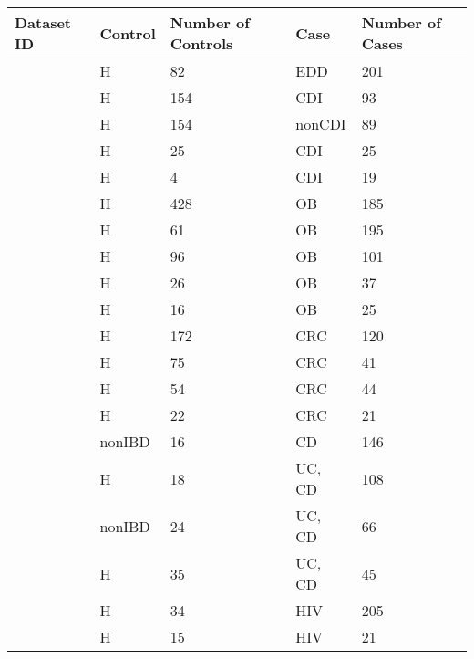 \begin{table}[hbtp!]
	\centering
	\begin{tabular}{l l p{} l p{}}
	\toprule
	   Dataset ID & Control & Number of Controls & Case &Number of Cases\\
	   \midrule
		\cite{edd-singh} & \acrshort{H} & 82 & \acrshort{EDD} & 201 \\
		\cite{cdi-schubert} & \acrshort{H} & 154 & \acrshort{CDI} & 93 \\
		\cite{cdi-schubert} & \acrshort{H} & 154 & \acrshort{nonCDI} & 89 \\
		\cite{cdi-vincent} & \acrshort{H} & 25 & \acrshort{CDI} & 25 \\
		\cite{cdi-youngster} & \acrshort{H} & 4 & \acrshort{CDI} & 19 \\
		\cite{ob-goodrich} & \acrshort{H} & 428 & \acrshort{OB} & 185 \\
		\cite{ob-turnbaugh} & \acrshort{H} & 61 & \acrshort{OB} & 195 \\
		\cite{ob-zupancic} & \acrshort{H} & 96 & \acrshort{OB} & 101 \\
		\cite{ob-ross} & \acrshort{H} & 26 & \acrshort{OB} & 37 \\
		\cite{nash-zhu} & \acrshort{H} & 16 & \acrshort{OB} & 25 \\
		\cite{crc-baxter} & \acrshort{H} & 172 & \acrshort{CRC} & 120 \\
		\cite{crc-zeller} & \acrshort{H} & 75 & \acrshort{CRC} & 41 \\
		\cite{crc-zhaowang} & \acrshort{H} & 54 & \acrshort{CRC} & 44 \\
		\cite{crc-chen} & \acrshort{H} & 22 & \acrshort{CRC} & 21 \\
		\cite{ibd-gevers} & \acrshort{nonIBD} & 16 & \acrshort{CD} & 146 \\
		\cite{ibd-morgan} & \acrshort{H} & 18 & \acrshort{UC}, \acrshort{CD} & 108 \\
		\cite{ibd-papa} & \acrshort{nonIBD} & 24 & \acrshort{UC}, \acrshort{CD} & 66 \\
		\cite{ibd-willing} & \acrshort{H} & 35 & \acrshort{UC}, \acrshort{CD} & 45 \\
		\cite{noguera2016gut} & \acrshort{H} & 34 & \acrshort{HIV} & 205 \\
		\cite{hiv-dinh} & \acrshort{H} & 15 & \acrshort{HIV} & 21 \\

\end{tabular}
\end{table}
